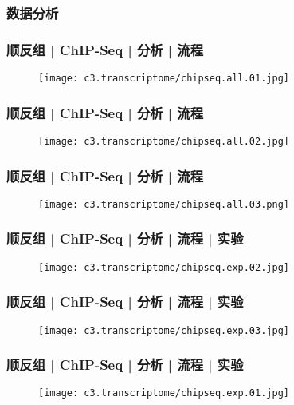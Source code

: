 \subsubsection{数据分析}
\begin{frame}
  \frametitle{顺反组 | ChIP-Seq | 分析 | 流程}
  \begin{figure}
    \centering
    \texttt{[image: c3.transcriptome/chipseq.all.01.jpg]}
  \end{figure}
\end{frame}

\begin{frame}
  \frametitle{顺反组 | ChIP-Seq | 分析 | 流程}
  \begin{figure}
    \centering
    \texttt{[image: c3.transcriptome/chipseq.all.02.jpg]}
  \end{figure}
\end{frame}

\begin{frame}
  \frametitle{顺反组 | ChIP-Seq | 分析 | 流程}
  \begin{figure}
    \centering
    \texttt{[image: c3.transcriptome/chipseq.all.03.png]}
  \end{figure}
\end{frame}

\begin{frame}
  \frametitle{顺反组 | ChIP-Seq | 分析 | 流程 | 实验}
  \begin{figure}
    \centering
    \texttt{[image: c3.transcriptome/chipseq.exp.02.jpg]}
  \end{figure}
\end{frame}

\begin{frame}
  \frametitle{顺反组 | ChIP-Seq | 分析 | 流程 | 实验}
  \begin{figure}
    \centering
    \texttt{[image: c3.transcriptome/chipseq.exp.03.jpg]}
  \end{figure}
\end{frame}

\begin{frame}
  \frametitle{顺反组 | ChIP-Seq | 分析 | 流程 | 实验}
  \begin{figure}
    \centering
    \texttt{[image: c3.transcriptome/chipseq.exp.01.jpg]}
  \end{figure}
\end{frame}

